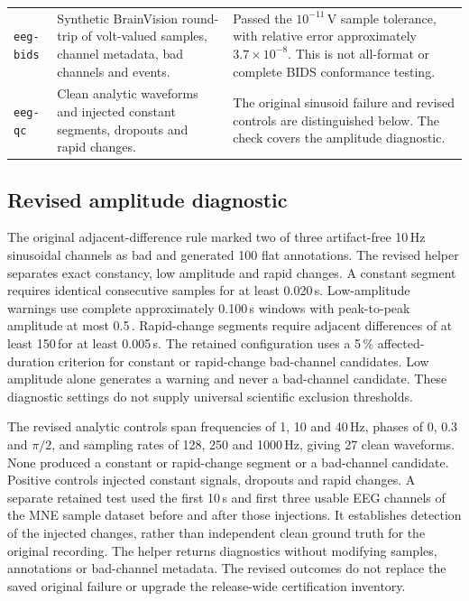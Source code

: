 \begin{table}[htbp]
\begin{tabularx}{\linewidth}{@{}l X X@{}}
\texttt{eeg-bids} & Synthetic BrainVision round-trip of volt-valued samples, channel metadata, bad channels and events. & Passed the $10^{-11}$\,V sample tolerance, with relative error approximately $3.7\times10^{-8}$. This is not all-format or complete BIDS conformance testing.\\
\texttt{eeg-qc} & Clean analytic waveforms and injected constant segments, dropouts and rapid changes. & The original sinusoid failure and revised controls are distinguished below. The check covers the amplitude diagnostic.\\
\bottomrule
\end{tabularx}
\end{table}

\subsection*{Revised amplitude diagnostic}
The original adjacent-difference rule marked two of three artifact-free 10\,Hz sinusoidal channels as bad and generated 100 flat annotations. The revised helper separates exact constancy, low amplitude and rapid changes. A constant segment requires identical consecutive samples for at least 0.020\,s. Low-amplitude warnings use complete approximately 0.100\,s windows with peak-to-peak amplitude at most 0.5\,\uV. Rapid-change segments require adjacent differences of at least 150\,\uV for at least 0.005\,s. The retained configuration uses a 5\,\% affected-duration criterion for constant or rapid-change bad-channel candidates. Low amplitude alone generates a warning and never a bad-channel candidate. These diagnostic settings do not supply universal scientific exclusion thresholds.

The revised analytic controls span frequencies of 1, 10 and 40\,Hz, phases of 0, 0.3 and $\pi/2$, and sampling rates of 128, 250 and 1000\,Hz, giving 27 clean waveforms. None produced a constant or rapid-change segment or a bad-channel candidate. Positive controls injected constant signals, dropouts and rapid changes. A separate retained test used the first 10\,s and first three usable EEG channels of the MNE sample dataset before and after those injections. It establishes detection of the injected changes, rather than independent clean ground truth for the original recording. The helper returns diagnostics without modifying samples, annotations or bad-channel metadata. The revised outcomes do not replace the saved original failure or upgrade the release-wide certification inventory.
